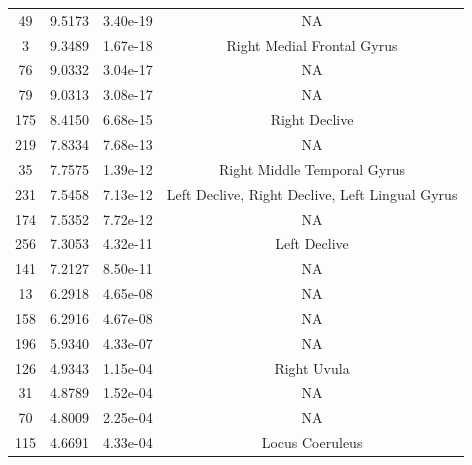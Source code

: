 \documentclass[10pt,letterpaper]{article}\usepackage[]{graphicx}\usepackage[]{color}
\begin{document}
\begin{center}
\begin{longtable}{|c|c|c|c|}
	49 & 9.5173 & 3.40e-19 & NA \\
	3 & 9.3489 & 1.67e-18 & Right Medial Frontal Gyrus \\
	76 & 9.0332 & 3.04e-17 & NA \\
	79 & 9.0313 & 3.08e-17 & NA \\
	175 & 8.4150 & 6.68e-15 & Right Declive \\
	219 & 7.8334 & 7.68e-13 & NA\\
	35 & 7.7575 & 1.39e-12 & Right Middle Temporal Gyrus\\
	231 & 7.5458 & 7.13e-12 & Left Declive, Right Declive, Left Lingual Gyrus\\
	174 & 7.5352 & 7.72e-12 & NA \\
	256 & 7.3053 & 4.32e-11 & Left Declive \\
	141 & 7.2127 & 8.50e-11 & NA \\
	13 & 6.2918 & 4.65e-08 & NA \\
	158 & 6.2916 & 4.67e-08 & NA \\
	196 & 5.9340 & 4.33e-07 & NA \\
	126 & 4.9343 & 1.15e-04 & Right Uvula\\
	31 & 4.8789 & 1.52e-04 & NA \\
	70 & 4.8009 & 2.25e-04 & NA \\
	115 & 4.6691 & 4.33e-04 & Locus Coeruleus \\
\end{longtable}
\end{center}
\end{document}

